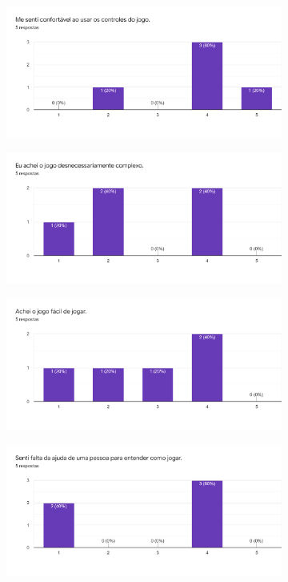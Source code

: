 \documentclass[
	12pt,				%
	openright,			%
	twoside,			%
	a4paper,			%
	english,			%
	french,				%
	spanish,			%
	brazil				%
	]{abntex2}
\begin{document}
\begin{figure}[h!]
  \centering
  \begin{subfigure}[b]{0.49\linewidth}
    \includegraphics[width=\linewidth]{forms1.png}
  \end{subfigure}
  \begin{subfigure}[b]{0.49\linewidth}
    \includegraphics[width=\linewidth]{forms2.png}
  \end{subfigure}
  \begin{subfigure}[b]{0.49\linewidth}
    \includegraphics[width=\linewidth]{forms3.png}
  \end{subfigure}
  \begin{subfigure}[b]{0.49\linewidth}
    \includegraphics[width=\linewidth]{forms4.png}

\end{subfigure}
\end{figure}
\end{document}

